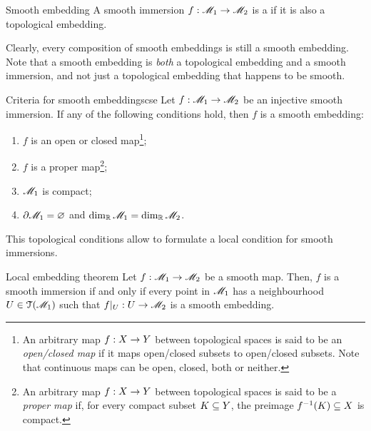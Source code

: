 \begin{definition}{Smooth embedding}{}
  A smooth immersion $ f : \mathscr{M}_1 \rightarrow \mathscr{M}_2 $ is a  if it is also a topological embedding.
\end{definition}

Clearly, every composition of smooth embeddings is still a smooth embedding. Note that a smooth embedding is \emph{both} a topological embedding and a smooth immersion, and not just a topological embedding that happens to be smooth.

\begin{proposition}{Criteria for smooth embeddings}{cse}
  Let $ f : \mathscr{M}_1 \rightarrow \mathscr{M}_2 $ be an injective smooth immersion. If any of the following conditions hold, then $ f $ is a smooth embedding:
  \begin{enumerate}
    \item \label{item:cse-1} $ f $ is an open or closed map\footnote{An arbitrary map $ f : X \rightarrow Y $ between topological spaces is said to be an \emph{open/closed map} if it maps open/closed subsets to open/closed subsets. Note that continuous maps can be open, closed, both or neither.};
    \item \label{item:cse-2} $ f $ is a proper map\footnote{An arbitrary map $ f : X \rightarrow Y $ between topological spaces is said to be a \emph{proper map} if, for every compact subset $ K \subseteq Y $, the preimage $ f^{-1}(K) \subseteq X $ is compact.};
    \item \label{item:cse-3} $ \mathscr{M}_1 $ is compact;
    \item \label{item:cse-4} $ \partial \mathscr{M}_1 = \varnothing $ and $ \dim_{\mathbb{R}} \mathscr{M}_1 = \dim_{\mathbb{R}} \mathscr{M}_2 $.
  \end{enumerate}
\end{proposition}

This topological conditions allow to formulate a local condition for smooth immersions.

\begin{theorem}{Local embedding theorem}{}
  Let $ f : \mathscr{M}_1 \rightarrow \mathscr{M}_2 $ be a smooth map. Then, $ f $ is a smooth immersion if and only if every point in $ \mathscr{M}_1 $ has a neighbourhood $ U \in \EuScript{T}(\mathscr{M}_1) $ such that $ f \vert_U : U \rightarrow \mathscr{M}_2 $ is a smooth embedding.
\end{theorem}

